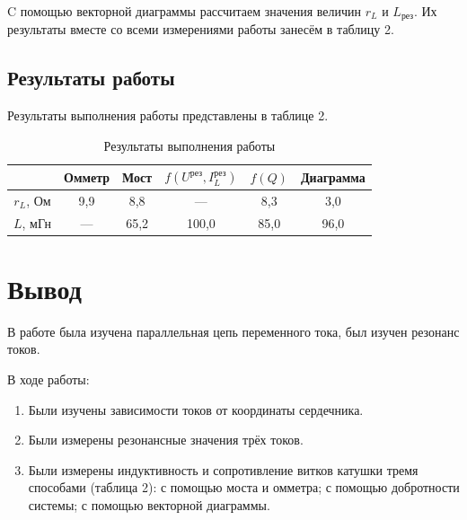 \documentclass[a4paper]{article}
\theoremstyle{definition}
\theoremstyle{remark}
\begin{document}
C помощью векторной диаграммы рассчитаем значения величин $r_L$ и $L_{\text{рез}}$. Их результаты вместе со всеми измерениями работы занесём в таблицу 2.

\subsection{Результаты работы}

Результаты выполнения работы представлены в таблице 2.

\begin{table}[h!]
    \centering
    \caption{Результаты выполнения работы}
    \begin{tabular}{|c|c|c|c|c|c|}
    \hline
              & Омметр & Мост & $f(U^{\text{рез}}, I_L^{\text{рез}})$ & $f(Q)$ & Диаграмма \\ \hline
    $r_L$, Ом & 9,9    & 8,8  & ---       & 8,3  & 3,0       \\ \hline
    $L$, мГн  & ---    & 65,2 & 100,0     & 85,0 & 96,0      \\ \hline
    \end{tabular}
    \end{table}

\section{Вывод}

В работе была изучена параллельная цепь переменного тока, был изучен резонанс токов. \medskip

\noindent В ходе работы:
\begin{enumerate}
    \item Были изучены зависимости токов от координаты сердечника.
    \item Были измерены резонансные значения трёх токов.
    \item Были измерены индуктивность и сопротивление витков катушки тремя способами (таблица 2): с помощью моста и омметра; с помощью добротности системы; с помощью векторной диаграммы.
\end{enumerate}
\end{document}
